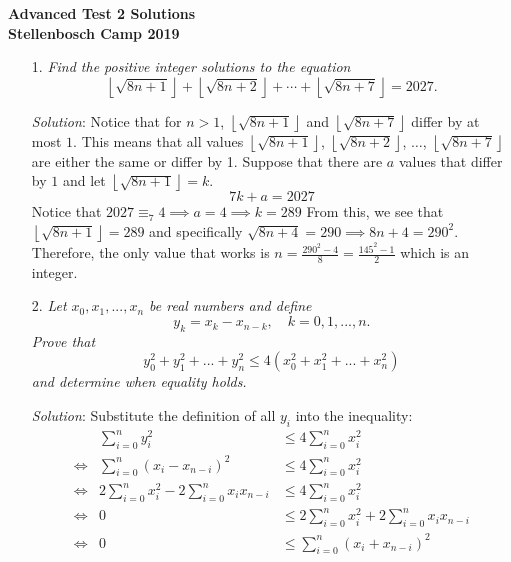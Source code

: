 \documentclass{article}
\begin{document}
\begin{center}
  \textbf{\Large Advanced Test 2 Solutions}
  \\ \vspace{1em}
  \textbf{\large Stellenbosch Camp 2019}
\end{center}

\vspace{12pt}


\begin{enumerate}

  \item[1.] %
  \newcommand{\floorsqrt}[1]{\left\lfloor\sqrt{#1}\right\rfloor} 
  \textit{
  Find the positive integer solutions to the equation
  \[ \floorsqrt{8n+1} +\floorsqrt{8n+2} +\dotsb +\floorsqrt{8n+7} = 2027. \]}
  
  \textit{Solution}:
  Notice that for $n > 1$, $\floorsqrt{8n + 1}$ and $\floorsqrt{8n + 7}$ differ by at most $1$. This means that all values $\floorsqrt{8n + 1}$, $\floorsqrt{8n + 2}$, $\dots$, $\floorsqrt{8n + 7}$ are either the same or differ by 1. Suppose that there are $a$ values that differ by $1$ and let $\floorsqrt{8n + 1} = k$.
  $$7k + a = 2027$$
  Notice that $2027 \equiv _7 4 \implies a = 4 \implies k = 289$ From this, we see that $\floorsqrt{8n + 1} = 289$ and specifically $\sqrt{8n + 4} = 290 \implies 8n + 4 = 290^2$. Therefore, the only value that works is $n = \frac{290^2 - 4}{8} = \frac{145^2 - 1}{2}$ which is an integer.
  
  \item[2.] %
  \textit{
  Let $x_0, x_1,..., x_n$ be real numbers and define
  \[y_k=x_k-x_{n-k}, \quad k=0,1,...,n.\]
  Prove that 
  \[y_0^2 + y_1^2+...+ y_n^2 \leq 4(x_0^2 + x_1^2 + ... + x_n^2) \]
  and determine when equality holds.
  }
  
  \textit{Solution}: 
  Substitute the definition of all $y_i$ into the inequality:
  \begin{align*}
    &&\sum_{i = 0}^{n}y_i^2 &\leq 4\sum_{i = 0}^{n}x_i^2 &\\
    &\iff& \sum_{i = 0}^{n}(x_i - x_{n - i})^2 &\leq 4\sum_{i = 0}^{n}x_i^2 &\\
    &\iff& 2\sum_{i = 0}^{n}x_i^2 - 2\sum_{i = 0}^{n}x_ix_{n - i} &\leq 4\sum_{i = 0}^{n}x_i^2& \\
    &\iff& 0 &\leq 2\sum_{i = 0}^{n}x_i^2 + 2\sum_{i = 0}^{n}x_ix_{n - i} \\
    &\iff& 0 &\leq \sum_{i = 0}^{n}(x_i + x_{n - i})^2 &
  \end{align*}
  

\end{enumerate}
\end{document}
